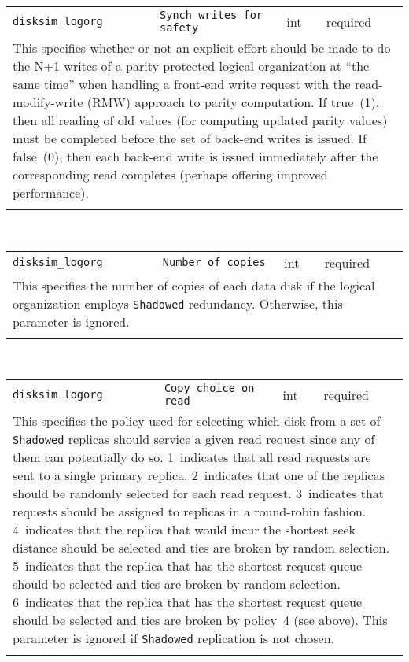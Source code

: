 \noindent 
\begin{tabular}{|p{\lpmodwidth}|p{\lpnamewidth}|p{0.5in}|p{0.5in}|}
\cline{1-4}
\texttt{disksim\_logorg} & \texttt{Synch writes for safety} & int & required \\ 
\cline{1-4}
\multicolumn{4}{|p{6in}|}{
This specifies whether or not an explicit effort should be made to do the
N+1 writes of a parity-protected logical organization at ``the same
time'' when handling a front-end write request with the
read-modify-write (RMW) approach to parity computation.
If true~(1), then all reading of old values (for computing updated
parity values) must be completed before the set of back-end writes is issued.
If false~(0), then each back-end write is issued immediately after the
corresponding read completes (perhaps offering improved performance).
}\\ 
\cline{1-4}
\multicolumn{4}{p{5in}}{}\\
\end{tabular}\\ 
\noindent 
\begin{tabular}{|p{\lpmodwidth}|p{\lpnamewidth}|p{0.5in}|p{0.5in}|}
\cline{1-4}
\texttt{disksim\_logorg} & \texttt{Number of copies} & int & required \\ 
\cline{1-4}
\multicolumn{4}{|p{6in}|}{
This specifies the number of copies of each data disk if the logical
organization employs \texttt{Shadowed} redundancy. Otherwise, this
parameter is ignored.
}\\ 
\cline{1-4}
\multicolumn{4}{p{5in}}{}\\
\end{tabular}\\ 
\noindent 
\begin{tabular}{|p{\lpmodwidth}|p{\lpnamewidth}|p{0.5in}|p{0.5in}|}
\cline{1-4}
\texttt{disksim\_logorg} & \texttt{Copy choice on read} & int & required \\ 
\cline{1-4}
\multicolumn{4}{|p{6in}|}{
This specifies the policy used for selecting which disk from a set of
\texttt{Shadowed} replicas should service a given read request since any
of them can potentially do so.
1~indicates that all read requests are sent to a single primary
replica.
2~indicates that one of the replicas should be randomly selected for
each read request.
3~indicates that requests should be assigned to replicas in a
round-robin fashion.
4~indicates that the replica that would incur the shortest seek
distance should be selected and ties are broken by random selection.
5~indicates that the replica that has the shortest request queue
should be selected and ties are broken by random selection.
6~indicates that the replica that has the shortest request queue
should be selected and ties are broken by policy~4 (see above). This
parameter is ignored if \texttt{Shadowed} replication is not chosen.
}\\ 
\cline{1-4}
\multicolumn{4}{p{5in}}{}\\
\end{tabular}\\ 

